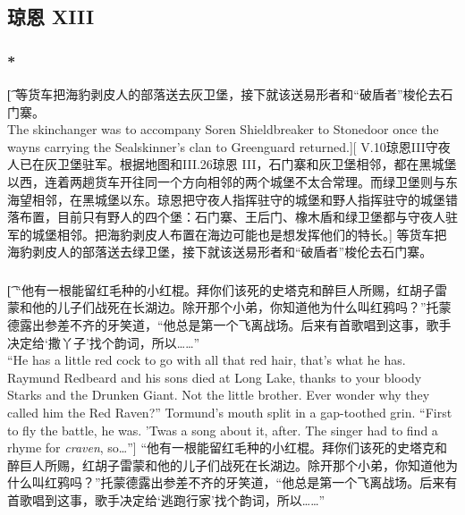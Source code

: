 \documentclass[12pt,a4paper]{article}
\begin{document}
\subsection{琼恩 XIII}
\subsubsection{\color{red}*}\t[
	等货车把海豹剥皮人的部落送去灰卫堡，接下就该送易形者和“破盾者”梭伦去石门寨。\\
	The skinchanger was to accompany Soren Shieldbreaker to Stonedoor once the wayns carrying the Sealskinner's clan to Greenguard returned.][
	V.10琼恩III守夜人已在灰卫堡驻军。根据地图和III.26琼恩 III，石门寨和灰卫堡相邻，都在黑城堡以西，连着两趟货车开往同一个方向相邻的两个城堡不太合常理。而绿卫堡则与东海望相邻，在黑城堡以东。琼恩把守夜人指挥驻守的城堡和野人指挥驻守的城堡错落布置，目前只有野人的四个堡：石门寨、王后门、橡木盾和绿卫堡都与守夜人驻军的城堡相邻。把海豹剥皮人布置在海边可能也是想发挥他们的特长。]
	等货车把海豹剥皮人的部落送去绿卫堡，接下就该送易形者和“破盾者”梭伦去石门寨。

\subsubsection{}\t[
	“他有一根能留红毛种的小红棍。拜你们该死的史塔克和醉巨人所赐，红胡子雷蒙和他的儿子们战死在长湖边。除开那个小弟，你知道他为什么叫红鸦吗？”托蒙德露出参差不齐的牙笑道，“他总是第一个飞离战场。后来有首歌唱到这事，歌手决定给‘撒丫子’找个韵词，所以……”\\
	“He has a little red cock to go with all that red hair, that's what he has. Raymund Redbeard and his sons died at Long Lake, thanks to your bloody Starks and the Drunken Giant. Not the little brother. Ever wonder why they called him the Red Raven?” Tormund's mouth split in a gap-toothed grin. “First to fly the battle, he was. 'Twas a song about it, after. The singer had to find a rhyme for \emph{craven}, so\ldots”]
	“他有一根能留红毛种的小红棍。拜你们该死的史塔克和醉巨人所赐，红胡子雷蒙和他的儿子们战死在长湖边。除开那个小弟，你知道他为什么叫红鸦吗？”托蒙德露出参差不齐的牙笑道，“他总是第一个飞离战场。后来有首歌唱到这事，歌手决定给‘逃跑行家’找个韵词，所以……”
	
\end{document}
